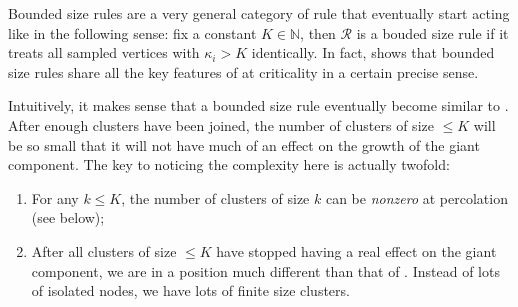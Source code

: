 \documentclass[twoside,10pt]{article}
\begin{document}
Bounded size rules are a very general category of rule that eventually start acting like \ER in the following sense: fix a constant $K \in \mathbb{N}$, then $\mathcal{R}$ is a bouded size rule if it treats all sampled vertices with $\kappa_i > K$ identically. In fact, \cite{RW-bounded} shows that bounded size rules share all the key features of \ER at criticality in a certain precise sense.

Intuitively, it makes sense that a bounded size rule eventually become similar to \ER. After enough clusters have been joined, the number of clusters of size $\leq K$ will be so small that it will not have much of an effect on the growth of the giant component. The key to noticing the complexity here is actually twofold:

\begin{enumerate}
	\item For any $k \leq K$, the number of clusters of size $k$ can be \textit{nonzero} at percolation (see  below);
        \item After all clusters of size $\leq K$ have stopped having a real effect on the giant component, we are in a position much different than that of \ER. Instead of lots of isolated nodes, we have lots of finite size clusters.
\end{enumerate}
\end{document}

